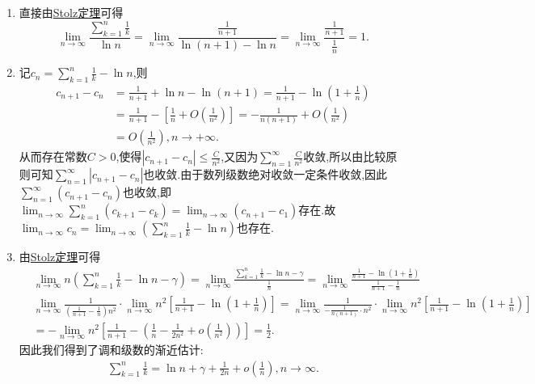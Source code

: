 \documentclass[../../main.tex]{subfiles}%
\begin{document}
\begin{solution}
\begin{enumerate}[(1)]
\item 直接由\hyperref[theorem:Stolz定理]{Stolz定理}可得
\[\lim_{n \to \infty} \frac{\sum\limits_{k = 1}^{n} \frac{1}{k}}{\ln n} = \lim_{n \to \infty} \frac{\frac{1}{n + 1}}{\ln (n + 1) - \ln n} = \lim_{n \to \infty} \frac{\frac{1}{n + 1}}{\frac{1}{n}} = 1.\]

\item 记\(c_n=\sum\limits_{k = 1}^n{\frac{1}{k}-\ln n}\),则
\begin{align*}
c_{n + 1}-c_n&=\frac{1}{n + 1}+\ln n-\ln (n + 1)
=\frac{1}{n + 1}-\ln\left(1+\frac{1}{n}\right)\\
&=\frac{1}{n + 1}-\left[\frac{1}{n}+O\left(\frac{1}{n^2}\right)\right]
=-\frac{1}{n(n + 1)}+O\left(\frac{1}{n^2}\right)\\
&=O\left(\frac{1}{n^2}\right),n\rightarrow +\infty.
\end{align*}
从而存在常数\(C > 0\),使得\(\left|c_{n + 1}-c_n\right|\leqslant \frac{C}{n^2}\),又因为\(\sum\limits_{n = 1}^{\infty}\frac{C}{n^2}\)收敛,所以由比较原则可知\(\sum\limits_{n = 1}^{\infty}{\left|c_{n + 1}-c_n\right|}\)也收敛.由于数列级数绝对收敛一定条件收敛,因此\(\sum\limits_{n = 1}^{\infty}{\left(c_{n + 1}-c_n\right)}\)也收敛,即\(\lim_{n\rightarrow\infty}\sum\limits_{k = 1}^n{\left(c_{k + 1}-c_k\right)}=\lim_{n\rightarrow\infty}\left(c_{n + 1}-c_1\right)\)存在.故\(\lim_{n\rightarrow\infty}c_n=\lim_{n\rightarrow\infty}\left(\sum\limits_{k = 1}^n{\frac{1}{k}-\ln n}\right)\)也存在.

\item 由\hyperref[theorem:Stolz定理]{Stolz定理}可得
\begin{align*}
&\lim_{n\rightarrow \infty} n\left( \sum\limits_{k=1}^n{\frac{1}{k}}-\ln n-\gamma \right) =\lim_{n\rightarrow \infty} \frac{\sum\limits_{k=1}^n{\frac{1}{k}}-\ln n-\gamma}{\frac{1}{n}}=\lim_{n\rightarrow \infty} \frac{\frac{1}{n+1}-\ln \left( 1+\frac{1}{n} \right)}{\frac{1}{n+1}-\frac{1}{n}}
\\
&\underset{n\rightarrow \infty}{\lim}\frac{1}{\left( \frac{1}{n+1}-\frac{1}{n} \right) n^2}\cdot \lim_{n\rightarrow \infty} n^2\left[ \frac{1}{n+1}-\ln \left( 1+\frac{1}{n} \right) \right] 
=\underset{n\rightarrow \infty}{\lim}\frac{1}{-\frac{1}{n\left( n+1 \right)}\cdot n^2}\cdot \lim_{n\rightarrow \infty} n^2\left[ \frac{1}{n+1}-\ln \left( 1+\frac{1}{n} \right) \right] 
\\
&=-\lim_{n\rightarrow \infty} n^2\left[ \frac{1}{n+1}-\left( \frac{1}{n}-\frac{1}{2n^2}+o\left( \frac{1}{n^2} \right) \right) \right] =\frac{1}{2}.
\end{align*}
因此我们得到了调和级数的渐近估计:
\begin{align*}
\sum\limits_{k=1}^n{\frac{1}{k}}=\ln n+\gamma +\frac{1}{2n}+o\left( \frac{1}{n} \right) ,n\rightarrow \infty.
\end{align*}
\end{enumerate}

\end{solution}
\end{document}
